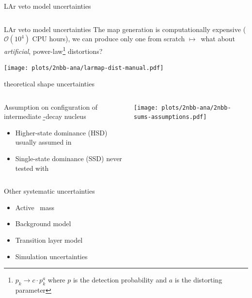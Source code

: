 \documentclass[10pt,aspectratio=169]{beamer}
\newcommand{\arrow}{$\longmapsto$}
\begin{document}
\begin{frame}{LAr veto model uncertainties}
\begin{columns}
\begin{column}{0.15\textwidth}
\begin{center}
      \end{center}
    \end{column}
  \end{columns}
\end{frame}
\begin{frame}{LAr veto model uncertainties}
  The map generation is computationally expensive ($\mathcal{O}{(10^4)}$ CPU
  hours), we can produce only one from scratch \arrow\ what about
  \emph{artificial}, power-law\footnote{$p_k \rightarrow c \cdot p_k^a$ where
  $p$ is the detection probability and $a$ is the distorting parameter}
  distortions?
  \begin{center}
    \texttt{[image: plots/2nbb-ana/larmap-dist-manual.pdf]}
  \end{center}
\end{frame}
\begin{frame}{\texorpdfstring{\nnbb}{2nbb} theoretical shape uncertainties}
  \begin{columns}
    \begin{column}{0.5\textwidth}
      Assumption on configuration of intermediate \b\b-decay nucleus
      \begin{itemize}
        \item Higher-state dominance (HSD) usually assumed in \gesix
        \item Single-state dominance (SSD) never tested with \gesix
      \end{itemize}
    \end{column}
    \begin{column}{0.5\textwidth}
      \begin{center}
        \texttt{[image: plots/2nbb-ana/2nbb-sums-assumptions.pdf]}
      \end{center}
    \end{column}
  \end{columns}
\end{frame}
\begin{frame}{Other systematic uncertainties}
  \begin{itemize}
    \item Active \gesix\ mass
    \item Background model
    \item Transition layer model
    \item Simulation uncertainties
  \end{itemize}
\end{frame}
\end{document}
